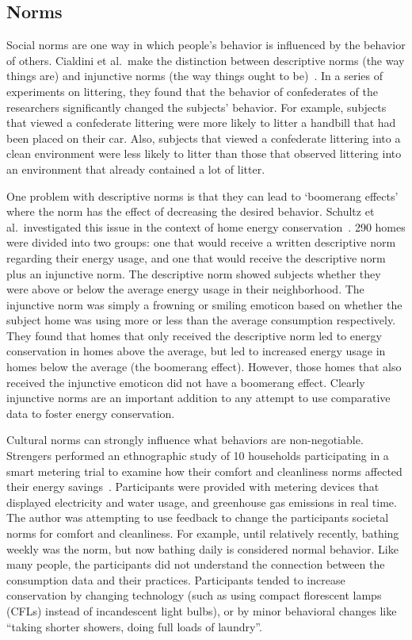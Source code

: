 \subsection{Norms}
\label{sec:norms}

Social norms are one way in which people's behavior is influenced by the behavior of others. Cialdini et al.\ make the distinction between descriptive norms (the way things are) and injunctive norms (the way things ought to be)~\cite{Cialdini90}. In a series of experiments on littering, they found that the behavior of confederates of the researchers significantly changed the subjects' behavior. For example, subjects that viewed a confederate littering were more likely to litter a handbill that had been placed on their car. Also, subjects that viewed a confederate littering into a clean environment were less likely to litter than those that observed littering into an environment that already contained a lot of litter.

One problem with descriptive norms is that they can lead to `boomerang effects' where the norm has the effect of decreasing the desired behavior. Schultz et al.\ investigated this issue in the context of home energy conservation~\cite{Schultz2007SocialNorms}. 290 homes were divided into two groups: one that would receive a written descriptive norm regarding their energy usage, and one that would receive the descriptive norm plus an injunctive norm. The descriptive norm showed subjects whether they were above or below the average energy usage in their neighborhood. The injunctive norm was simply a frowning or smiling emoticon based on whether the subject home was using more or less than the average consumption respectively. They found that homes that only received the descriptive norm led to energy conservation in homes above the average, but led to increased energy usage in homes below the average (the boomerang effect). However, those homes that also received the injunctive emoticon did not have a boomerang effect. Clearly injunctive norms are an important addition to any attempt to use comparative data to foster energy conservation.

Cultural norms can strongly influence what behaviors are non-negotiable. Strengers performed an ethnographic study of 10 households participating in a smart metering trial to examine how their comfort and cleanliness norms affected their energy savings~\cite{strengers-comfort-norms-2008}. Participants were provided with metering devices that displayed electricity and water usage, and greenhouse gas emissions in real time. The author was attempting to use feedback to change the participants societal norms for comfort and cleanliness. For example, until relatively recently, bathing weekly was the norm, but now bathing daily is considered normal behavior. Like many people, the participants did not understand the connection between the consumption data and their practices. Participants tended to increase conservation by changing technology (such as using compact florescent lamps (CFLs) instead of incandescent light bulbs), or by minor behavioral changes like ``taking shorter showers, doing full loads of laundry''.

